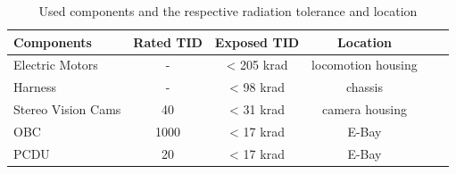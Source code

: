 \begin{table}[htb]
\centering
\caption{Used components and the respective radiation tolerance and location}
\begin{adjustbox}{max width=\textwidth}
\begin{tabular}[l]{lccccc}

	\toprule
		Components	&	Rated TID	&	Exposed TID	&	Location\\
	\midrule
	
	Electric Motors	&	-	&	< 205 krad	&	locomotion housing\\	
	
	Harness	&	-	&	< 98 krad	&	chassis\\	
	
	Stereo Vision Cams	&	40	&	< 31 krad	&	camera housing\\	
	
	OBC	&	1000	&	< 17 krad	&	E-Bay\\
	
	PCDU	&	20	&	< 17 krad	&	E-Bay\\
	

	\bottomrule

\end{tabular}
\end{adjustbox}
\label{tab:RadiationList}
\end{table}

